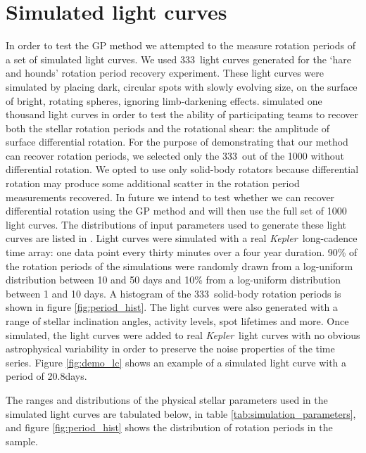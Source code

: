 \documentclass[useAMS, usenatbib, preprint, 12pt]{aastex}
\newcommand{\naigrain}{333}
\newcommand{\aigrainexampleperiod}{20.8}
\newcommand{\Kepler}{{\it Kepler}}
\newcommand{\kepler}{\Kepler}
\begin{document}
\section{Simulated light curves}
\label{sec:simulations}

In order to test the GP method we attempted to the measure rotation periods of
a set of simulated light curves.
We used \naigrain\ light curves generated for the \citet{Aigrain2015}
`hare and hounds' rotation period recovery experiment.
These light curves were simulated by placing dark, circular spots with slowly
evolving size, on the surface of bright, rotating spheres, ignoring
limb-darkening effects.
\citet{Aigrain2015} simulated one thousand light curves in order to test the
ability of participating teams to recover both the stellar rotation periods
and the rotational shear: the amplitude of surface differential rotation.
For the purpose of demonstrating that our method can recover rotation periods,
we selected only the \naigrain\ out of the 1000 without differential
rotation.
We opted to use only solid-body rotators because differential rotation may
produce some additional scatter in the rotation period measurements recovered.
In future we intend to test whether we can recover differential rotation using
the GP method and will then use the full set of 1000 light curves.
The distributions of input parameters used to generate these light curves are
listed in \citet{Aigrain2015}.
Light curves were simulated with a real \Kepler\ long-cadence time array:
one data point every thirty minutes over a four year duration.
90\% of the rotation periods of the simulations were randomly drawn from a
log-uniform distribution between 10 and 50 days and 10\% from a log-uniform
distribution between 1 and 10 days.
A histogram of the \naigrain\ solid-body rotation periods is shown in figure
\ref{fig:period_hist}.
The light curves were also generated with a range of stellar inclination
angles, activity levels, spot lifetimes and more.
Once simulated, the light curves were added to real \kepler\ light curves with
no obvious astrophysical variability in order to preserve the noise properties
of the time series.
Figure \ref{fig:demo_lc} shows an example of a simulated light curve with a
period of \aigrainexampleperiod days.

The ranges and distributions of the physical stellar parameters used in the
simulated light curves are tabulated below, in table
\ref{tab:simulation_parameters}, and figure \ref{fig:period_hist} shows the
distribution of rotation periods in the \citet{Aigrain2015} sample.
\end{document}
